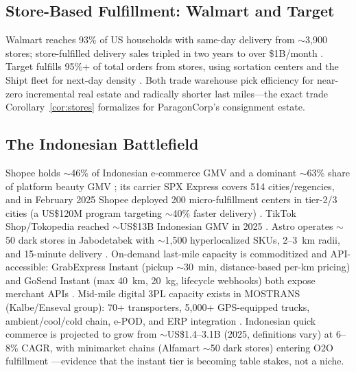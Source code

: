 \documentclass[journal]{IEEEtran}
\begin{document}
\subsection{Store-Based Fulfillment: Walmart and Target}
Walmart reaches 93\% of US households with same-day delivery from ${\sim}$3{,}900 stores; store-fulfilled delivery sales tripled in two years to over \$1B/month \cite{walmart,walmartsales}. Target fulfills 95\%+ of total orders from stores, using sortation centers and the Shipt fleet for next-day density \cite{target}. Both trade warehouse pick efficiency for near-zero incremental real estate and radically shorter last miles---the exact trade Corollary~\ref{cor:stores} formalizes for ParagonCorp's consignment estate.

\subsection{The Indonesian Battlefield}
Shopee holds ${\sim}$46\% of Indonesian e-commerce GMV and a dominant ${\sim}$63\% share of platform beauty GMV \cite{shopeeshare,shopeebeauty}; its carrier SPX Express covers 514 cities/regencies, and in February 2025 Shopee deployed 200 micro-fulfillment centers in tier-2/3 cities (a US\$120M program targeting ${\sim}$40\% faster delivery) \cite{spx,shopeemfc}. TikTok Shop/Tokopedia reached ${\sim}$US\$13B Indonesian GMV in 2025 \cite{tiktok,tiktokgmv}. Astro operates ${\sim}$50 dark stores in Jabodetabek with ${\sim}$1{,}500 hyperlocalized SKUs, 2--3~km radii, and 15-minute delivery \cite{astrotc,astroken,astrogpca}. On-demand last-mile capacity is commoditized and API-accessible: GrabExpress Instant (pickup ${\sim}$30~min, distance-based per-km pricing) and GoSend Instant (max 40~km, 20~kg, lifecycle webhooks) both expose merchant APIs \cite{grab,gosend}. Mid-mile digital 3PL capacity exists in MOSTRANS (Kalbe/Enseval group): 70+ transporters, 5{,}000+ GPS-equipped trucks, ambient/cool/cold chain, e-POD, and ERP integration \cite{mostrans,mostranskalbe}. Indonesian quick commerce is projected to grow from ${\sim}$US\$1.4--3.1B (2025, definitions vary) at 6--8\% CAGR, with minimarket chains (Alfamart ${\sim}$50 dark stores) entering O2O fulfillment \cite{qcmarket}---evidence that the instant tier is becoming table stakes, not a niche.
\end{document}
